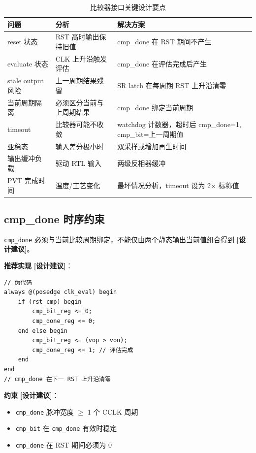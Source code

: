 \documentclass[UTF8,a4paper,11pt]{ctexart}
\newcommand{\suggested}{\textcolor{suggestblue}{\textbf{[设计建议]}}}
\begin{document}
\begin{table}[H]
\centering
\caption{比较器接口关键设计要点}
\label{tab:cmp-design-points}
\small
\begin{tabular}{p{2.5cm}p{4cm}p{6cm}}
\toprule
问题 & 分析 & 解决方案 \\
\midrule
reset 状态     & RST 高时输出保持旧值      & cmp\_done 在 RST 期间不产生 \\
evaluate 状态  & CLK 上升沿触发评估        & cmp\_done 在评估完成后产生 \\
stale output 风险 & 上一周期结果残留         & SR latch 在每周期 RST 上升沿清零 \\
当前周期隔离   & 必须区分当前与上周期结果  & cmp\_done 绑定当前周期 \\
timeout        & 比较器可能不收敛          & watchdog 计数器，超时后 cmp\_done=1, cmp\_bit=上一周期值 \\
亚稳态         & 输入差分极小时            & 双采样或增加再生时间 \\
输出缓冲负载   & 驱动 RTL 输入             & 两级反相器缓冲 \\
PVT 完成时间   & 温度/工艺变化             & 最坏情况分析，timeout 设为 2$\times$ 标称值 \\
\bottomrule
\end{tabular}
\end{table}

\subsection{cmp\_done 时序约束}

\texttt{cmp\_done} 必须与当前比较周期绑定，不能仅由两个静态输出当前值组合得到 \suggested。

\textbf{推荐实现} \suggested：

\begin{lstlisting}[style=verilogstyle]
// 伪代码
always @(posedge clk_eval) begin
    if (rst_cmp) begin
        cmp_bit_reg <= 0;
        cmp_done_reg <= 0;
    end else begin
        cmp_bit_reg <= (vop > von);
        cmp_done_reg <= 1; // 评估完成
    end
end
// cmp_done 在下一 RST 上升沿清零
\end{lstlisting}

\textbf{约束} \suggested：
\begin{itemize}[leftmargin=2em]
\item \texttt{cmp\_done} 脉冲宽度 $\geq$ 1 个 CCLK 周期
\item \texttt{cmp\_bit} 在 \texttt{cmp\_done} 有效时稳定
\item \texttt{cmp\_done} 在 RST 期间必须为 0
\end{itemize}
\end{document}
